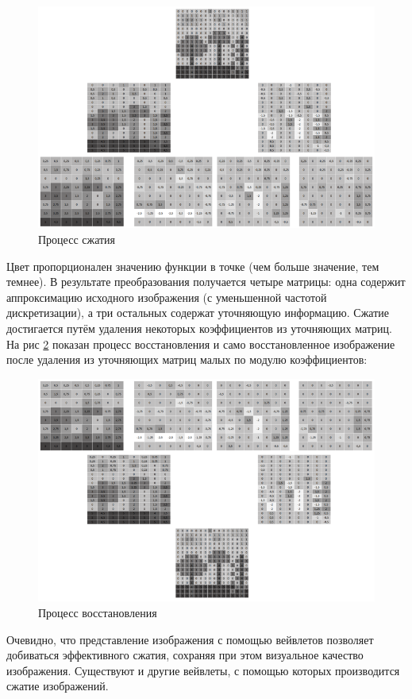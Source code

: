 \begin{figure}[H]
	\begin{center}
		\includegraphics[scale=0.7]{pics/wavelet/compression.png}
		\caption{Процесс сжатия} 
		\label{pic:wavelet_compression}
	\end{center}
\end{figure}
Цвет пропорционален значению функции в точке (чем больше значение, тем темнее). В результате преобразования получается четыре матрицы: одна содержит аппроксимацию исходного изображения (с уменьшенной частотой дискретизации), а три остальных содержат уточняющую информацию.
Сжатие достигается путём удаления некоторых коэффициентов из уточняющих матриц. На рис \ref {pic:wavelet_uncompression} показан процесс восстановления и само восстановленное изображение после удаления из уточняющих матриц малых по модулю коэффициентов:

\begin{figure}[H]
	\begin{center}
		\includegraphics[scale=0.7]{pics/wavelet/uncompression.png}
		\caption{Процесс восстановления} 
		\label{pic:wavelet_uncompression}
	\end{center}
\end{figure}
Очевидно, что представление изображения с помощью вейвлетов позволяет добиваться эффективного сжатия, сохраняя при этом визуальное качество изображения. Существуют и другие вейвлеты, с помощью которых производится сжатие изображений.


